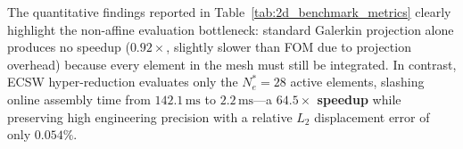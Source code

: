 \begin{table}[htbp]
\centering
\caption{Performance metrics of model reduction strategies for the 2D notched benchmark.}
\label{tab:2d_benchmark_metrics}
\end{table}

The quantitative findings reported in Table~\ref{tab:2d_benchmark_metrics} clearly highlight the non-affine evaluation bottleneck: standard Galerkin projection alone produces no speedup ($0.92\times$, slightly slower than FOM due to projection overhead) because every element in the mesh must still be integrated. In contrast, ECSW hyper-reduction evaluates only the $N_e^* = 28$ active elements, slashing online assembly time from $142.1\,\text{ms}$ to $2.2\,\text{ms}$—a \textbf{$64.5\times$ speedup} while preserving high engineering precision with a relative $L_2$ displacement error of only $0.054\%$.


